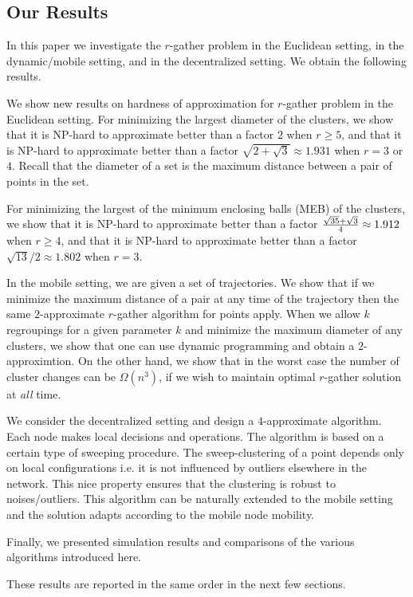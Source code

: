 

\subsection{Our Results}
In this paper we investigate the $r$-gather problem in the Euclidean setting, in the dynamic/mobile setting, and in the decentralized setting. We obtain the following results. 
\bitem

\item We show new results on hardness of approximation for $r$-gather problem in the Euclidean setting. For minimizing the largest diameter of the clusters, we show that it is NP-hard to approximate better than a factor $2$ when $r\geq5$, and that it is NP-hard to approximate better than a factor $\sqrt{2+\sqrt{3}} \approx 1.931$ when $r=3$ or $4$.  Recall that the diameter of a set is the maximum distance between a pair of points in the set.

For minimizing the largest of the minimum enclosing balls (MEB) of the clusters, we show that it is NP-hard to approximate better than a factor ${\sqrt{35}+\sqrt{3} \over 4} \approx 1.912$ when $r \geq 4$, and that it is NP-hard to approximate better than a factor $\sqrt{13}/2 \approx 1.802$ when $r=3$.

\item In the mobile setting, we are given a set of trajectories. We show that if we  minimize the maximum distance of a pair at any time of the trajectory then the same $2$-approximate $r$-gather algorithm for points apply. When we allow $k$ regroupings for a given parameter $k$ and minimize the maximum diameter of any clusters, we show that one can use dynamic programming and obtain a $2$-approximtion. On the other hand, we show that in the worst case the number of cluster changes can be $\Omega(n^3)$, if we wish to maintain optimal $r$-gather solution at \emph{all} time.

\item We consider the decentralized setting and design a $4$-approximate algorithm. Each node makes local decisions and operations. The algorithm is based on a certain type of sweeping procedure. The sweep-clustering of a point depends only on local configurations i.e. it is not influenced by outliers elsewhere in the network. This nice property ensures that the clustering is robust to noises/outliers. This algorithm can be naturally extended to the mobile setting and the solution adapts according to the mobile node mobility. 

\item Finally, we presented simulation results and comparisons of the various algorithms introduced here. 

\eitem

These results are reported in the same order in the next few sections. 
